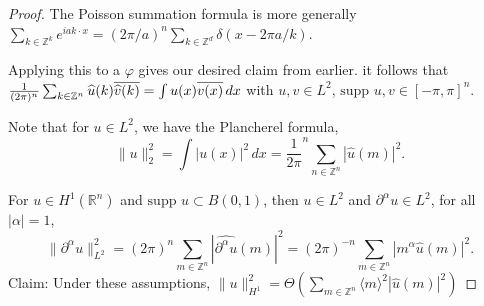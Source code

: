 \documentclass[12pt]{scrartcl}
\newcommand{\Z}{\mathbb{Z}}
\newcommand{\R}{\mathbb{R}}
\renewcommand{\hat}{\widehat}
\newcommand{\<}{\langle}
\renewcommand{\>}{\rangle}
\let \phi \varphi
\newcommand{\supp}{\text{supp }}
\begin{document}
\begin{proof}
The Poisson summation formula is more generally $\sum_{k \in \Z^k} e^{iak \cdot x} = (2\pi/a)^n \sum_{k \in \Z^d} \delta(x - 2\pi a/k)$.

Applying this to a $\phi$ gives our desired claim from earlier.  it follows that $\frac{1}{(2\pi)^n} \sum_{k \in \Z^n} \hat{u}(k)\ol{\hat{v}(k)} = \int u(x) \ol{v(x)}\,dx$ with $u, v \in L^2$, $\supp u, v \in [-\pi, \pi]^n$.

Note that for $u \in L^2$, we have the Plancherel formula,
$$\|u\|_2^2 = \int |u(x)|^2\,dx = \frac{1}{2\pi}^n \sum_{n \in \Z^n} |\hat{u}(m)|^2.$$

For $u \in H^1(\R^n)$ and $\supp u \subset B(0, 1)$, then $u \in L^2$ and $\partial^\alpha u \in L^2$, for all $|\alpha| = 1$, 
$$\|\partial^\alpha u\|_{L^2}^2 = (2\pi)^n \sum_{ m \in \Z^n} |\hat{\partial^\alpha u}(m)|^2 = (2\pi)^{-n} \sum_{m \in \Z^n} |m^\alpha\hat{u}(m)|^2.$$
Claim: Under these assumptions, $\|u\|_{H^1}^2 = \Theta( \sum_{m \in \Z^n} \<m\>^2 |\hat{u}(m)|^2)$
\end{proof}
 
\end{document}
